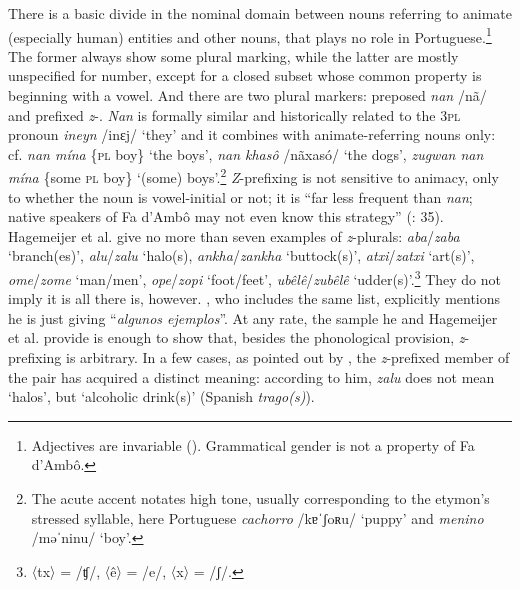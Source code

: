 \documentclass[output=paper]{langscibook}
\begin{document}
There is a basic divide in the nominal domain between nouns referring to animate (especially human) entities and other nouns, that plays no role in Portuguese.\footnote{Adjectives are invariable (\citealt[68]{HagemeijerEtAl2020}). Grammatical gender is not a property of Fa d’Ambô.} The former always show some plural marking, while the latter are mostly unspecified for number, except for a closed subset whose common property is beginning with a vowel. And there are two plural markers: preposed \textit{nan} /nã/ and prefixed \textit{z}{}-. \textit{Nan} is formally similar and historically related to the \textsc{3pl} pronoun \textit{ineyn} /inɛj/ ‘they’ and it combines with animate-referring nouns only: cf. \textit{nan mína } \{\textsc{pl} boy\} ‘the boys’, \textit{nan khasô} /nãxasó/ ‘the dogs’, \textit{zugwan nan mína} \{some \textsc{pl} boy\} ‘(some) boys’.\footnote{The acute accent notates high tone, usually corresponding to the etymon’s stressed syllable, here Portuguese \textit{cachorro} /kɐˈʃoʀu/ ‘puppy’ and \textit{menino} /məˈninu/ ‘boy’.} \textit{Z}{}-prefixing is not sensitive to animacy, only to whether the noun is vowel-initial or not; it is “far less frequent than \textit{nan}; native speakers of Fa d’Ambô may not even know this strategy” (\citealt{HagemeijerEtAl2020}: 35). Hagemeijer et al. give no more than seven examples of \textit{z}{}-plurals: \textit{aba}\slash\textit{zaba} ‘branch(es)’, \textit{alu}\slash\textit{zalu} ‘halo(s), \textit{ankha}\slash\textit{zankha} ‘buttock(s)’, \textit{atxi}\slash\textit{zatxi} ‘art(s)’, \textit{ome}\slash\textit{zome} ‘man\slash men’, \textit{ope}\slash\textit{zopi} ‘foot\slash feet’, \textit{ubêlê}\slash\textit{zubêlê} ‘udder(s)’.\footnote{〈tx〉 = /ʧ/, 〈ê〉 = /e/, 〈x〉 = /ʃ/.} They do not imply it is all there is, however.  \citet[90]{ZamoraSegorbe2007}, who includes the same list, explicitly mentions he is just giving “\textit{algunos ejemplos}”. At any rate, the sample he and Hagemeijer et al. provide is enough to show that, besides the phonological provision, \textit{z}{}-prefixing is arbitrary. In a few cases, as pointed out by \citet[144]{ZamoraSegorbe2007}, the \textit{z}{}-prefixed member of the pair has acquired a distinct meaning: according to him, \textit{zalu} does not mean ‘halos’, but ‘alcoholic drink(s)’ (Spanish \textit{trago(s)}).
\end{document}
